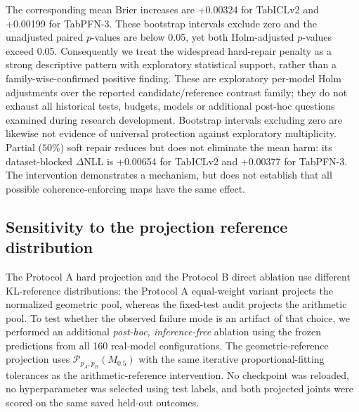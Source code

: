 \documentclass[a4paper,fleqn]{cas-sc}
\begin{document}
The corresponding mean Brier increases are +0.00324 for TabICLv2 and +0.00199 for TabPFN-3. These bootstrap intervals exclude zero and the unadjusted paired $p$-values are below 0.05, yet both Holm-adjusted $p$-values exceed 0.05. Consequently we treat the widespread hard-repair penalty as a strong descriptive pattern with exploratory statistical support, rather than a family-wise-confirmed positive finding. These are exploratory per-model Holm adjustments over the reported candidate/reference contrast family; they do not exhaust all historical tests, budgets, models or additional post-hoc questions examined during research development. Bootstrap intervals excluding zero are likewise not evidence of universal protection against exploratory multiplicity. Partial ($50\%$) soft repair reduces but does not eliminate the mean harm: its dataset-blocked $\Delta$NLL is +0.00654 for TabICLv2 and +0.00377 for TabPFN-3. The intervention demonstrates a mechanism, but does not establish that all possible coherence-enforcing maps have the same effect.


\subsection{Sensitivity to the projection reference distribution}
\label{sec:projectionbridge}
The Protocol A hard projection and the Protocol B direct ablation use different KL-reference distributions: the Protocol A equal-weight variant projects the normalized geometric pool, whereas the fixed-test audit projects the arithmetic pool. To test whether the observed failure mode is an artifact of that choice, we performed an additional \emph{post-hoc, inference-free} ablation using the frozen predictions from all 160 real-model configurations. The geometric-reference projection uses $\mathcal{P}_{p_A,p_B}(M_{0.5})$ with the same iterative proportional-fitting tolerances as the arithmetic-reference intervention. No checkpoint was reloaded, no hyperparameter was selected using test labels, and both projected joints were scored on the same saved held-out outcomes.
\end{document}
